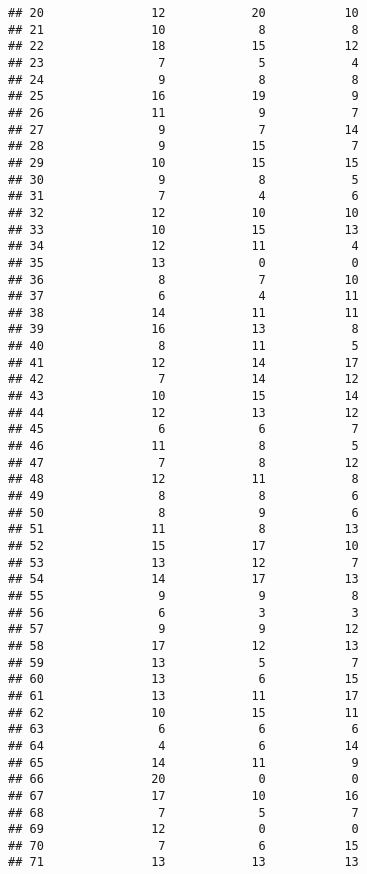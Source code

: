 \documentclass[
]{article}
\begin{document}
\begin{verbatim}
## 20               12            20           10
## 21               10             8            8
## 22               18            15           12
## 23                7             5            4
## 24                9             8            8
## 25               16            19            9
## 26               11             9            7
## 27                9             7           14
## 28                9            15            7
## 29               10            15           15
## 30                9             8            5
## 31                7             4            6
## 32               12            10           10
## 33               10            15           13
## 34               12            11            4
## 35               13             0            0
## 36                8             7           10
## 37                6             4           11
## 38               14            11           11
## 39               16            13            8
## 40                8            11            5
## 41               12            14           17
## 42                7            14           12
## 43               10            15           14
## 44               12            13           12
## 45                6             6            7
## 46               11             8            5
## 47                7             8           12
## 48               12            11            8
## 49                8             8            6
## 50                8             9            6
## 51               11             8           13
## 52               15            17           10
## 53               13            12            7
## 54               14            17           13
## 55                9             9            8
## 56                6             3            3
## 57                9             9           12
## 58               17            12           13
## 59               13             5            7
## 60               13             6           15
## 61               13            11           17
## 62               10            15           11
## 63                6             6            6
## 64                4             6           14
## 65               14            11            9
## 66               20             0            0
## 67               17            10           16
## 68                7             5            7
## 69               12             0            0
## 70                7             6           15
## 71               13            13           13

\end{verbatim}
\end{document}
